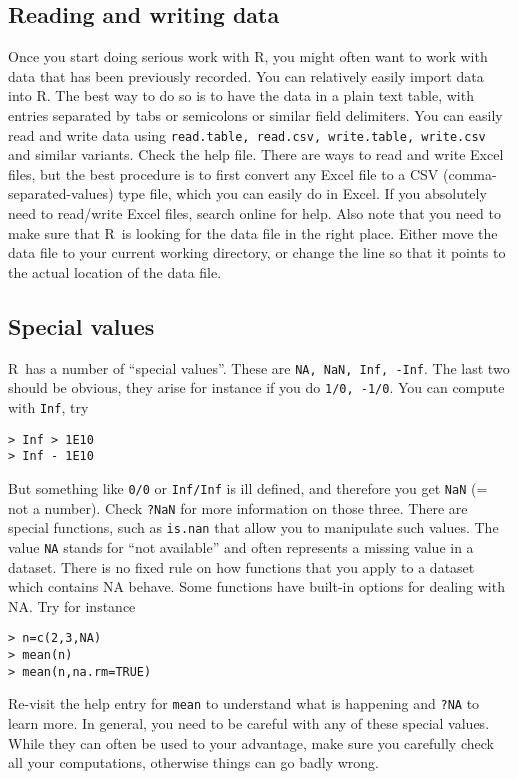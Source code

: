 \documentclass [11pt]{article}
\newcommand{\code}[1]{{\tt #1}}
\newcommand\R{{\sf R}}
\numberwithin{exercise}{section}
\begin{document}
\subsection{Reading and writing data}
Once you start doing serious work with \R, you might often want to work with data that has been previously recorded. 
You can relatively easily import data into \R. The best way to do so is to have the data in a plain text table, 
with entries separated by tabs or semicolons or similar field delimiters. 
You can easily read and write data using \code{read.table, read.csv, write.table, write.csv} and similar variants. Check the help file. There are ways to read and write Excel files, but the best procedure is to first convert any Excel file to a CSV (comma-separated-values) type file, which you can easily do in Excel. If you absolutely need to read/write Excel files, search online for help.
Also note that you need to make sure that \R\ is looking  for the data file in the right place. 
Either move the data file to your current working directory, or change the line so that it points to the actual location of the data file.

\subsection{Special values \label{secspecial}}
\R\ has a number of ``special values''. These are \code{NA, NaN, Inf, -Inf}. The last two should be obvious, they arise for instance if you do 
\code{1/0, -1/0}. You can compute with \code{Inf}, try
\vspace{-0.1in}
\begin{verbatim}
> Inf > 1E10
> Inf - 1E10
\end{verbatim}
\vspace{-0.1in}
But something like \code{0/0} or \code{Inf/Inf} is ill defined, and therefore you get \code{NaN} (= not a number). Check \code{?NaN} for more information on those three. There are special functions, such as \code{is.nan} that allow you to manipulate such values.
The value \code{NA} stands for ``not available'' and often represents a missing value in a dataset. 
There is no fixed rule on how functions that you apply to a dataset which contains NA behave. Some functions have built-in options for dealing with NA. Try for instance
\vspace{-0.1in}
\begin{verbatim}
> n=c(2,3,NA)
> mean(n)
> mean(n,na.rm=TRUE)
\end{verbatim}
\vspace{-0.1in}
Re-visit the help entry for \code{mean} to understand what is happening and \code{?NA} to learn more. 
In general, you need to be careful with any of these special values. While they can often be used to your advantage, make sure you carefully check all your computations, otherwise things can go badly wrong.
\end{document}
